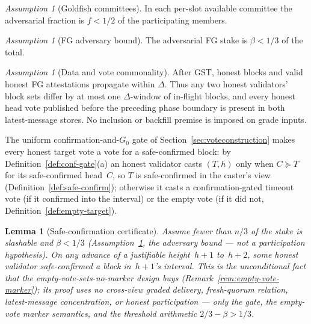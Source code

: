 \ifx\litemode\undefined\documentclass{article}\fi
\newcommand{\GST}{\ensuremath{\mathrm{GST}}\xspace}
\newcommand{\Gzero}{\ensuremath{G_{0}}}
\theoremstyle{plain}
\newtheorem{lemma}{Lemma}
\theoremstyle{definition}
\theoremstyle{remark}
\newtheorem{assumption}[theorem]{Assumption}
\begin{document}
\begin{assumption}[Goldfish committees]\label{ass:heal-goldfish}
In each per-slot available committee the adversarial fraction is \(f < 1/2\) of
the participating members.
\end{assumption}

\begin{assumption}[FG adversary bound]\label{ass:heal-beta}
The adversarial FG stake is \(\beta < 1/3\) of the total.
\end{assumption}

\begin{assumption}[Data and vote commonality]\label{ass:heal-prop}
After \GST, honest blocks and valid honest FG attestations propagate within
\(\Delta\).  Thus any two honest validators' block sets differ by at most one
\(\Delta\)-window of in-flight blocks, and every honest head vote published
before the preceding phase boundary is present in both latest-message stores.
No inclusion or backfill premise is imposed on grade inputs.
\end{assumption}

The uniform confirmation-and-\(\Gzero\) gate of
Section~\ref{sec:voteconstruction} makes every honest target vote a vote for a
safe-confirmed block: by Definition~\ref{def:conf-gate}(a) an honest validator
casts \((T, h)\) only when \(C \succeq T\) for its safe-confirmed head~\(C\), so
\(T\) is safe-confirmed in the caster's view (Definition~\ref{def:safe-confirm});
otherwise it casts a confirmation-gated timeout vote (if it confirmed into the
interval) or the empty vote (if it did not, Definition~\ref{def:empty-target}).

\begin{lemma}[Safe-confirmation certificate]\label{lem:safe-confirm-cert}
Assume fewer than \(n/3\) of the stake is slashable and \(\beta < 1/3\)
(Assumption~\ref{ass:heal-beta}, the adversary bound --- not a participation
hypothesis).  On any advance of a justifiable height~\(h+1\) to~\(h+2\), some
honest validator safe-confirmed a block in~\(h+1\)'s interval.  This is the
unconditional fact that the empty-vote-sets-no-marker design buys
(Remark~\ref{rem:empty-vote-marker}); its proof uses no cross-view graded
delivery, fresh-quorum relation, latest-message concentration, or honest
participation --- only the
gate, the empty-vote marker semantics, and the threshold arithmetic
\(2/3-\beta>1/3\).
\end{lemma}
\end{document}
